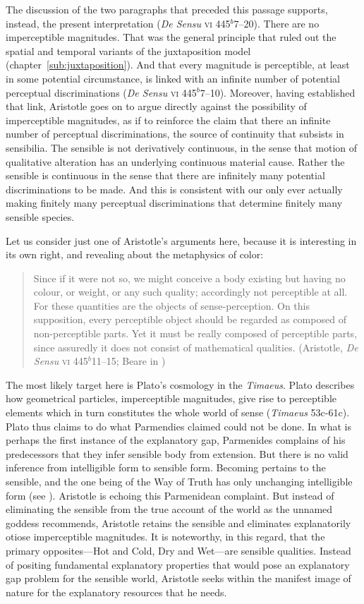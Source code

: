 The discussion of the two paragraphs that preceded this passage supports, instead, the present interpretation (\emph{De Sensu} \textsc{vi} 445\( ^{b} \)7--20). There are no imperceptible magnitudes. That was the general principle that ruled out the spatial and temporal variants of the juxtaposition model (chapter~\ref{sub:juxtaposition}). And that every magnitude is perceptible, at least in some potential circumstance, is linked with an infinite number of potential perceptual discriminations (\emph{De Sensu} \textsc{vi} 445\( ^{b} \)7--10). Moreover, having established that link, Aristotle goes on to argue directly against the possibility of imperceptible magnitudes, as if to reinforce the claim that there an infinite number of perceptual discriminations, the source of continuity that subsists in sensibilia. The sensible is not derivatively continuous, in the sense that motion of qualitative alteration has an underlying continuous material cause. Rather the sensible is continuous in the sense that there are infinitely many potential discriminations to be made. And this is consistent with our only ever actually making finitely many perceptual discriminations that determine finitely many sensible species.

Let us consider just one of Aristotle's arguments here, because it is interesting in its own right, and revealing about the metaphysics of color:
\begin{quote}
	Since if it were not so, we might conceive a body existing but having no colour, or weight, or any such quality; accordingly not perceptible at all. For these quantities are the objects of sense-perception. On this supposition, every perceptible object should be regarded as composed of non-perceptible parts. Yet it must be really composed of perceptible parts, since assuredly it does not consist of mathematical qualities. (Aristotle, \emph{De Sensu} \textsc{vi} 445\( ^{b} \)11--15; Beare in \citealt[18]{Barnes:1984uq})
\end{quote}
The most likely target here is Plato's cosmology in the \emph{Timaeus}. Plato describes how geometrical particles, imperceptible magnitudes, give rise to perceptible elements which in turn constitutes the whole world of sense (\emph{Timaeus} 53c-61c). Plato thus claims to do what Parmendies claimed could not be done. In what is perhaps the first instance of the explanatory gap, Parmenides complains of his predecessors that they infer sensible body from extension. But there is no valid inference from intelligible form to sensible form. Becoming pertains to the sensible, and the one being of the Way of Truth has only unchanging intelligible form (see \citealt[49]{Guthrie:1965ys}). Aristotle is echoing this Parmenidean complaint. But instead of eliminating the sensible from the true account of the world as the unnamed goddess recommends, Aristotle retains the sensible and eliminates explanatorily otiose imperceptible magnitudes. It is noteworthy, in this regard, that the primary opposites---Hot and Cold, Dry and Wet---are sensible qualities. Instead of positing fundamental explanatory properties that would pose an explanatory gap problem for the sensible world, Aristotle seeks within the manifest image of nature for the explanatory resources that he needs. 

